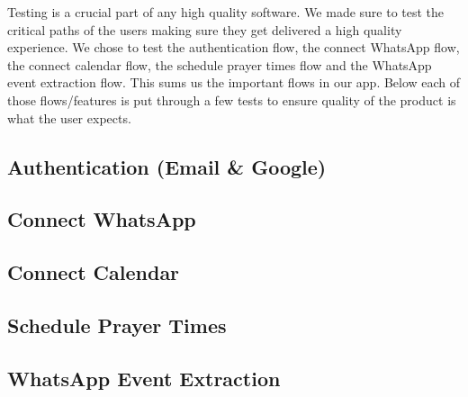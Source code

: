 Testing is a crucial part of any high quality software. We made sure to test the critical paths of the users making sure they get delivered a high quality experience. We chose to test the authentication flow, the connect WhatsApp flow, the connect calendar flow, the schedule prayer times flow and the WhatsApp event extraction flow. This sums us the important flows in our app. Below each of those flows/features is put through a few tests to ensure quality of the product is what the user expects.

\subsection{Authentication (Email \& Google)}
\subsection{Connect WhatsApp}
\subsection{Connect Calendar}
\subsection{Schedule Prayer Times}
\subsection{WhatsApp Event Extraction}